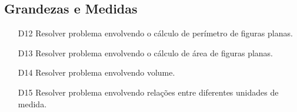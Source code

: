 \subsection{Grandezas e Medidas}
\begin{enumerate}
    \item[D12] \label{itm9:D12} Resolver problema envolvendo o cálculo de perímetro de figuras planas.
    \item[D13] \label{itm9:D13} Resolver problema envolvendo o cálculo de área de figuras planas.
    \item[D14] \label{itm9:D14} Resolver problema envolvendo volume.
    \item[D15] \label{itm9:D15} Resolver problema envolvendo relações entre diferentes unidades de medida.
\end{enumerate}

